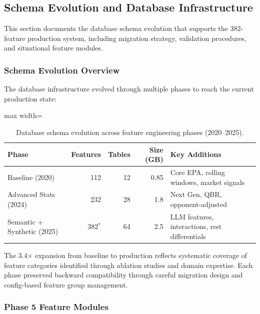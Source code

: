 \subsection{Schema Evolution and Database Infrastructure}
\label{subsec:phase5-features}

This section documents the database schema evolution that supports the 382-feature production system, including migration strategy, validation procedures, and situational feature modules.

\subsubsection{Schema Evolution Overview}

The database infrastructure evolved through multiple phases to reach the current production state:

\begin{table}[htbp]
  \centering
  \small
  \caption{Database schema evolution across feature engineering phases (2020--2025).}
  \label{tab:schema-evolution}
  \begin{adjustbox}{max width=\textwidth}
  \begin{tabular}{@{} l r r r l @{}}
    \toprule
    \textbf{Phase} & \textbf{Features} & \textbf{Tables} & \textbf{Size (GB)} & \textbf{Key Additions} \\
    \midrule
    Baseline (2020) & 112 & 12 & 0.85 & Core EPA, rolling windows, market signals \\
    Advanced Stats (2024) & 232 & 28 & 1.8 & Next Gen, QBR, opponent-adjusted \\
    Semantic + Synthetic (2025) & 382$^*$ & 64 & 2.5 & LLM features, interactions, rest differentials \\
    \bottomrule
  \end{tabular}
  \end{adjustbox}
\end{table}

The 3.4$\times$ expansion from baseline to production reflects systematic coverage of feature categories identified through ablation studies and domain expertise. Each phase preserved backward compatibility through careful migration design and config-based feature group management.

\subsubsection{Phase 5 Feature Modules}

